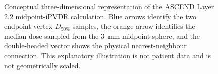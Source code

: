 \begin{figure}[htbp]
\caption{Conceptual three-dimensional representation of the ASCEND Layer 2.2
midpoint-iPVDR calculation. Blue arrows identify the two endpoint vertex
$D_{50\%}$ samples, the orange arrow identifies the median dose sampled from
the 3~mm midpoint sphere, and the double-headed vector shows the physical
nearest-neighbour connection. This explanatory illustration is not patient
data and is not geometrically scaled.}
\label{fig:ascend-ipvdr-3d-annotated}
\end{figure}

